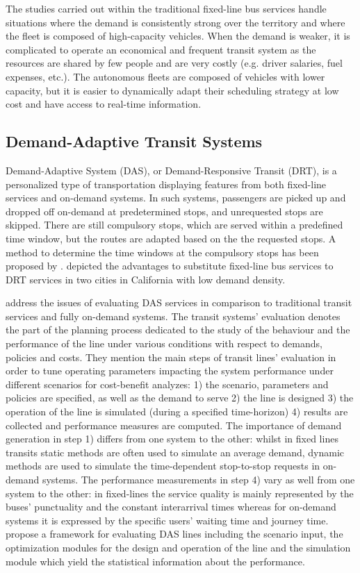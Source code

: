 \documentclass[12pt,a4paper]{article}
\begin{document}
The studies carried out within the traditional fixed-line bus services handle situations where the demand is consistently strong over the territory and where the fleet is composed of high-capacity vehicles. When the demand is weaker, it is complicated to operate an economical and frequent transit system as the resources are shared by few people and are very costly (e.g. driver salaries, fuel expenses, etc.). The autonomous fleets are composed of vehicles with lower capacity, but it is easier to dynamically adapt their scheduling strategy at low cost and have access to real-time information.

\subsection{Demand-Adaptive Transit Systems}\label{das}
Demand-Adaptive System (DAS), or Demand-Responsive Transit (DRT), is a personalized type of transportation displaying features from both fixed-line services and on-demand systems. In such systems, passengers are picked up and dropped off on-demand at predetermined stops, and unrequested stops are skipped. There are still compulsory stops, which are served within a predefined time window, but the routes are adapted based on the the requested stops. A method to determine the time windows at the compulsory stops has been proposed by  \cite{masterschedule}. \cite{dasdesign} depicted the advantages to substitute fixed-line bus services to DRT services in two cities in California with low demand density. 

\cite{evaluation} address the issues of evaluating DAS services in comparison to traditional transit services and fully on-demand systems. The transit systems' evaluation denotes the part of the planning process dedicated to the study of the behaviour and the performance of the line under various conditions with respect to demands, policies and costs. They mention the main steps of transit lines' evaluation in order to tune operating parameters impacting the system performance under different scenarios for cost-benefit analyzes: 1) the scenario, parameters and policies are specified, as well as the demand to serve 2) the line is designed 3) the operation of the line is simulated (during a specified time-horizon) 4) results are collected and performance measures are computed. The importance of demand generation in step 1) differs from one system to the other: whilst in fixed lines transits static methods are often used to simulate an average demand, dynamic methods are used to simulate the time-dependent stop-to-stop requests in on-demand systems. The performance measurements in step 4) vary as well from one system to the other: in fixed-lines the service quality is mainly represented by the buses' punctuality and the constant interarrival times whereas for on-demand systems it is expressed by the specific users' waiting time and journey time. \cite{evaluation} propose a framework for evaluating DAS lines including the scenario input, the optimization modules for the design and operation of the line and the simulation module which yield the statistical information about the performance.
\end{document}
